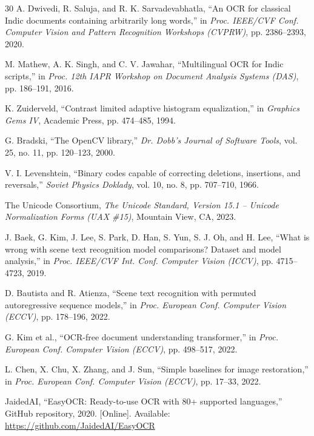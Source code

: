 \documentclass[11pt,a4paper]{article}
\begin{document}
\begin{thebibliography}{30}
A. Dwivedi, R. Saluja, and R. K. Sarvadevabhatla, ``An OCR for classical Indic documents containing arbitrarily long words,'' in \textit{Proc. IEEE/CVF Conf. Computer Vision and Pattern Recognition Workshops (CVPRW)}, pp. 2386--2393, 2020.

M. Mathew, A. K. Singh, and C. V. Jawahar, ``Multilingual OCR for Indic scripts,'' in \textit{Proc. 12th IAPR Workshop on Document Analysis Systems (DAS)}, pp. 186--191, 2016.

K. Zuiderveld, ``Contrast limited adaptive histogram equalization,'' in \textit{Graphics Gems IV}, Academic Press, pp. 474--485, 1994.

G. Bradski, ``The OpenCV library,'' \textit{Dr. Dobb's Journal of Software Tools}, vol. 25, no. 11, pp. 120--123, 2000.

V. I. Levenshtein, ``Binary codes capable of correcting deletions, insertions, and reversals,'' \textit{Soviet Physics Doklady}, vol. 10, no. 8, pp. 707--710, 1966.

The Unicode Consortium, \textit{The Unicode Standard, Version 15.1 -- Unicode Normalization Forms (UAX \#15)}, Mountain View, CA, 2023.

J. Baek, G. Kim, J. Lee, S. Park, D. Han, S. Yun, S. J. Oh, and H. Lee, ``What is wrong with scene text recognition model comparisons? Dataset and model analysis,'' in \textit{Proc. IEEE/CVF Int. Conf. Computer Vision (ICCV)}, pp. 4715--4723, 2019.

D. Bautista and R. Atienza, ``Scene text recognition with permuted autoregressive sequence models,'' in \textit{Proc. European Conf. Computer Vision (ECCV)}, pp. 178--196, 2022.

G. Kim et al., ``OCR-free document understanding transformer,'' in \textit{Proc. European Conf. Computer Vision (ECCV)}, pp. 498--517, 2022.

L. Chen, X. Chu, X. Zhang, and J. Sun, ``Simple baselines for image restoration,'' in \textit{Proc. European Conf. Computer Vision (ECCV)}, pp. 17--33, 2022.

JaidedAI, ``EasyOCR: Ready-to-use OCR with 80+ supported languages,'' GitHub repository, 2020. [Online]. Available: \url{https://github.com/JaidedAI/EasyOCR}

\end{thebibliography}
\end{document}
